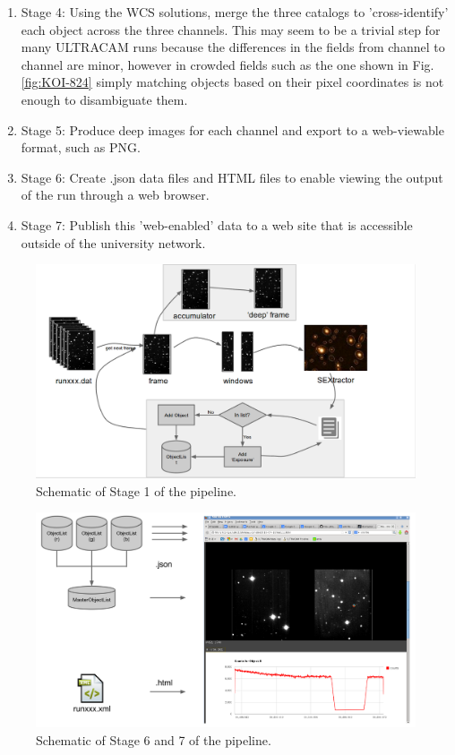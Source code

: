 \begin{enumerate}
	\item Stage 4: Using the WCS solutions, merge the three catalogs to 'cross-identify' each object across the three channels. This may seem to be a trivial step for many ULTRACAM runs because the differences in the fields from channel to channel are minor, however in crowded fields such as the one shown in Fig. \ref{fig:KOI-824} simply matching objects based on their pixel coordinates is not enough to disambiguate them.
	\item Stage 5: Produce deep images for each channel and export to a web-viewable format, such as PNG. 
	\item Stage 6: Create .json data files and HTML files to enable viewing the output of the run through a web browser. 
	\item Stage 7: Publish this 'web-enabled' data to a web site that is accessible outside of the university network.  
		
\end{enumerate}

\begin{figure}[!h]
	\centering
	\includegraphics[width=130mm]{images/flowchart.png}
	\caption{Schematic of Stage 1 of the pipeline.}
	\label{flowchart}
\end{figure}


\begin{figure}[!h]
	\centering
	\includegraphics[width=130mm]{images/webpublish.png}
	\caption{Schematic of Stage 6 and 7 of the pipeline.}
	\label{webpublish}
\end{figure}



